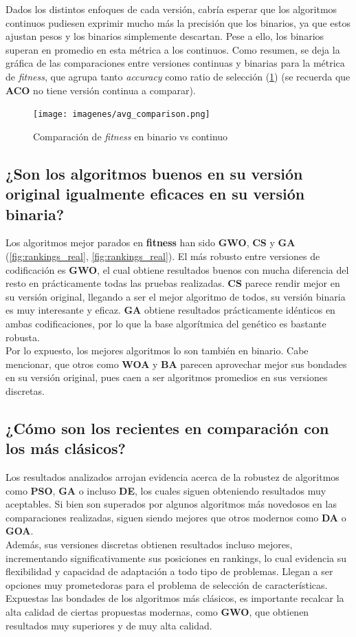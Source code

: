 Dados los distintos enfoques de cada versión, cabría esperar que los algoritmos continuos pudiesen exprimir mucho más la precisión que los binarios, ya que estos ajustan pesos y los binarios simplemente descartan. Pese a ello, los binarios superan en promedio en esta métrica a los continuos. Como resumen, se deja la gráfica de las comparaciones entre versiones continuas y binarias para la métrica de \textit{fitness}, que agrupa tanto \textit{accuracy} como ratio de selección (\ref{fig:bin_vs_real_avg}) (se recuerda que \textbf{ACO} no tiene versión continua a comparar).

\begin{figure}[htp]
    \texttt{[image: imagenes/avg\_comparison.png]}
    \caption{Comparación de \textit{fitness} en binario vs continuo}
    \label{fig:bin_vs_real_avg}
\end{figure}

\subsection{¿Son los algoritmos buenos en su versión original igualmente eficaces en su versión binaria?}
Los algoritmos mejor parados en \textbf{fitness} han sido \textbf{GWO}, \textbf{CS} y \textbf{GA} (\ref{fig:rankings_real}, \ref{fig:rankings_real}). El más robusto entre versiones de codificación es \textbf{GWO}, el cual obtiene resultados buenos con mucha diferencia del resto en prácticamente todas las pruebas realizadas. \textbf{CS} parece rendir mejor en su versión original, llegando a ser el mejor algoritmo de todos, su versión binaria es muy interesante y eficaz. \textbf{GA} obtiene resultados prácticamente idénticos en ambas codificaciones, por lo que la base algorítmica del genético es bastante robusta.\\[6pt]
Por lo expuesto, los mejores algoritmos lo son también en binario. Cabe mencionar, que otros como \textbf{WOA} y \textbf{BA} parecen aprovechar mejor sus bondades en su versión original, pues caen a ser algoritmos promedios en sus versiones discretas.
\subsection{¿Cómo son los recientes en comparación con los más clásicos?}
Los resultados analizados arrojan evidencia acerca de la robustez de algoritmos como \textbf{PSO}, \textbf{GA} o incluso \textbf{DE}, los cuales siguen obteniendo resultados muy aceptables. Si bien son superados por algunos algoritmos más novedosos en las comparaciones realizadas, siguen siendo mejores que otros modernos como \textbf{DA} o \textbf{GOA}.\\[6pt]
Además, sus versiones discretas obtienen resultados incluso mejores, incrementando significativamente sus posiciones en rankings, lo cual evidencia su flexibilidad y capacidad de adaptación a todo tipo de problemas. Llegan a ser opciones muy prometedoras para el problema de selección de características.\\[6pt]
Expuestas las bondades de los algoritmos más clásicos, es importante recalcar la alta calidad de ciertas propuestas modernas, como \textbf{GWO}, que obtienen resultados muy superiores y de muy alta calidad.
